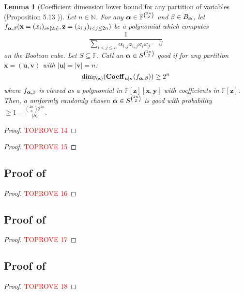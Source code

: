 \documentclass[11pt]{article}
\newtheorem{lemma}[theorem]{Lemma}
\newcommand{\F}{\mathbb{F}}
\begin{document}
\begin{lemma}[Coefficient dimension lower bound for any partition of variables (Proposition 5.13 \cite{FSTW21})]\label{lem: coeff dim any partition}
    Let $n\in \mathbb{N}$. For any $\bfalpha \in \F^{\binom{2n}{2}}$ and $\beta \in B_{\boldsymbol{\alpha}}$, let $f_{\boldsymbol{\alpha},\beta}(\mathbf{x}=(x_i)_{i\in[2n]},\mathbf{z}=(z_{i,j})_{i<j\leq 2n})$ be a polynomial which computes $$\frac{1}{\sum_{i<j\leq n}\alpha_{i,j}z_{i,j}x_ix_j - \beta}$$ on the Boolean cube. Let $S\subseteq \F$. Call an $\boldsymbol{\alpha} \in S^{\binom{2n}{2}}$ \emph{good} if for any partition $\mathbf{x} = (\mathbf{u},\mathbf{v})$ with $|\mathbf{u}|=|\mathbf{v}| = n$: $$ \dim_{\F(\mathbf{z})}(\bfCoeff_{\mathbf{u}|\mathbf{v}}(f_{\bfalpha,\beta})) \geq 2^n$$
    where $f_{\boldsymbol{\alpha},\beta}$ is viewed as a polynomial in $\F[\mathbf{z}][\mathbf{x},\mathbf{y}]$ with coefficients in $\F[\mathbf{z}]$. \\
    Then, a uniformly randomly chosen $\boldsymbol{\alpha} \in S^{\binom{2n}{2}}$ is good with probability $\geq 1 - \frac{\binom{2n}{n}2^{2n}}{|S|}$.
\end{lemma}
\begin{proof}\textcolor{red}{TOPROVE 14}\end{proof}

\roabplbdanyorder
\begin{proof}\textcolor{red}{TOPROVE 15}\end{proof}











\subsection{Proof of }\label{app:proof-monomial-axioms}

\monomialaxioms*

\begin{proof}\textcolor{red}{TOPROVE 16}\end{proof}










\subsection{Proof of }\label{app:proof-ind-deg}

\boundedinddegml*

\begin{proof}\textcolor{red}{TOPROVE 17}\end{proof}











\subsection{Proof of }\label{app:claim-partial-uni}

\partialmlproduni*

\begin{proof}\textcolor{red}{TOPROVE 18}\end{proof}
\end{document}
